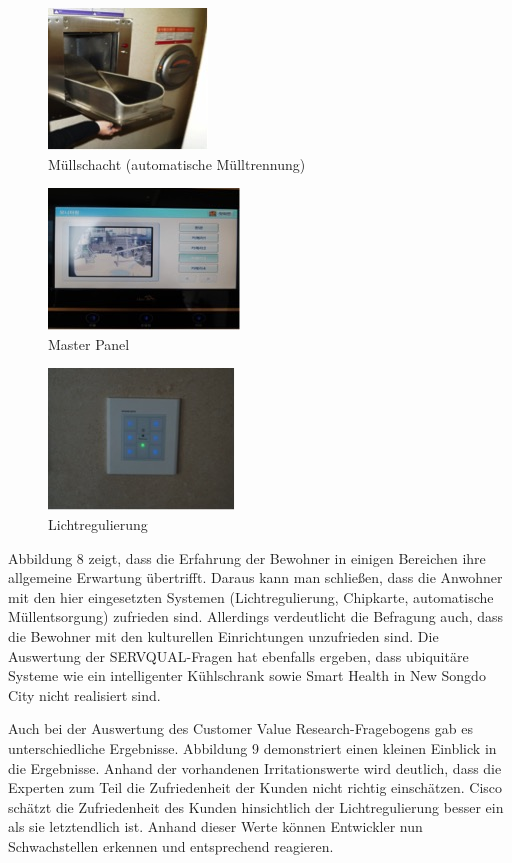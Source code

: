 \documentclass[a4paper,
fontsize=11pt,
oneside,
numbers=noperiodatend,
parskip=half-,
bibliography=totoc,
final
]{scrartcl}
\begin{document}
\begin{figure}[htbp]
\centering
\includegraphics{img/Abbildung5.jpg}
\caption{Müllschacht (automatische Mülltrennung)}
\end{figure}

\begin{figure}[htbp]
\centering
\includegraphics{img/Abbildung6.jpg}
\caption{Master Panel}
\end{figure}

\begin{figure}[htbp]
\centering
\includegraphics{img/Abbildung7.jpg}
\caption{Lichtregulierung}
\end{figure}

Abbildung 8 zeigt, dass die Erfahrung der Bewohner in einigen Bereichen
ihre allgemeine Erwartung übertrifft. Daraus kann man schließen, dass
die Anwohner mit den hier eingesetzten Systemen (Lichtregulierung,
Chipkarte, automatische Müllentsorgung) zufrieden sind. Allerdings
verdeutlicht die Befragung auch, dass die Bewohner mit den kulturellen
Einrichtungen unzufrieden sind. Die Auswertung der SERVQUAL-Fragen hat
ebenfalls ergeben, dass ubiquitäre Systeme wie ein intelligenter
Kühlschrank sowie Smart Health in New Songdo City nicht realisiert sind.

Auch bei der Auswertung des Customer Value Research-Fragebogens gab es
unterschiedliche Ergebnisse. Abbildung 9 demonstriert einen kleinen
Einblick in die Ergebnisse. Anhand der vorhandenen Irritationswerte wird
deutlich, dass die Experten zum Teil die Zufriedenheit der Kunden nicht
richtig einschätzen. Cisco schätzt die Zufriedenheit des Kunden
hinsichtlich der Lichtregulierung besser ein als sie letztendlich ist.
Anhand dieser Werte können Entwickler nun Schwachstellen erkennen und
entsprechend reagieren.
\end{document}
